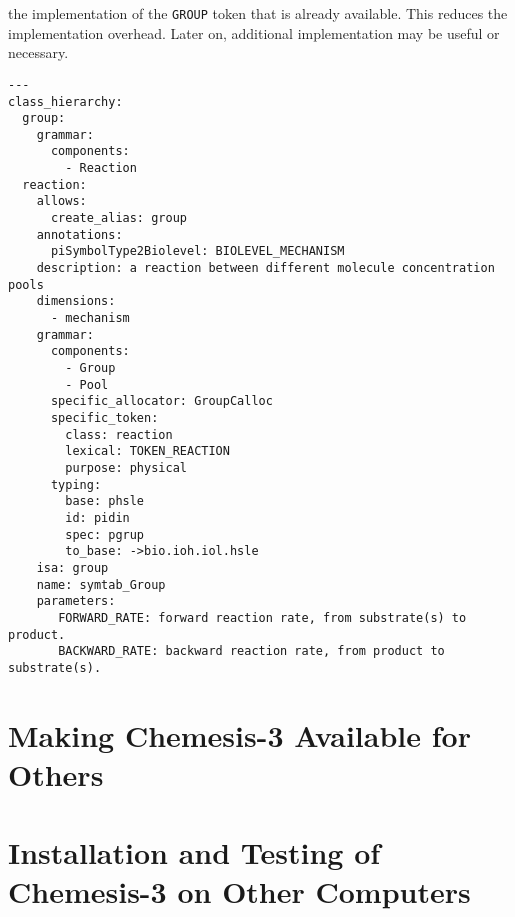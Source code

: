\documentclass[12pt]{article}
\begin{document}
\begin{enumerate}
  the implementation of the {\tt GROUP} token that is already
  available.  This reduces the implementation overhead.  Later on,
  additional implementation may be useful or necessary.
\begin{verbatim}
---
class_hierarchy:
  group:
    grammar:
      components:
        - Reaction
  reaction:
    allows:
      create_alias: group
    annotations:
      piSymbolType2Biolevel: BIOLEVEL_MECHANISM
    description: a reaction between different molecule concentration pools
    dimensions:
      - mechanism
    grammar:
      components:
        - Group
        - Pool
      specific_allocator: GroupCalloc
      specific_token:
        class: reaction
        lexical: TOKEN_REACTION
        purpose: physical
      typing:
        base: phsle
        id: pidin
        spec: pgrup
        to_base: ->bio.ioh.iol.hsle
    isa: group
    name: symtab_Group
    parameters:
       FORWARD_RATE: forward reaction rate, from substrate(s) to product.
       BACKWARD_RATE: backward reaction rate, from product to substrate(s).
\end{verbatim}
\end{enumerate}


\section*{Making {\bf Chemesis-3} Available for Others}

\section*{Installation and Testing of {\bf Chemesis-3} on Other Computers}




\end{document}
